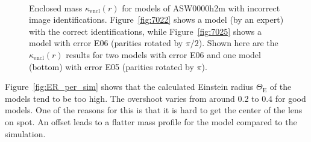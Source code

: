 \documentclass[12pt,preprint]{aastex}
\newcommand{\ERf}[1][]{Einstein radius $\Theta_\text{E#1}$\xspace} %
\newcommand{\kenc}[1][r]{$\kappa_\text{encl}(#1)$\xspace}
\newcommand{\figref}[1]{Figure~\ref{fig:#1}}
\newcommand{\Figref}[1]{Figure~\ref{fig:#1}}
\newcommand{\asw}[1]{ASW000#1\xspace}
\begin{document}
\begin{figure}
  \centering
   \\
  \caption{Enclosed mass \kenc for models of \asw{0h2m} with incorrect image identifications. \figref{7022} shows a model (by an expert) with the correct identifications, while \figref{7025} shows a model with error E06 (parities rotated by $\pi/2$).  Shown here are the \kenc results for two models with error E06 and one model (bottom) with error E05 (parities rotated by $\pi$).}
\label{fig:kapenc_compare_faulty}
\end{figure}

\Figref{ER_per_sim} shows that the calculated \ERf of the models tend to be too high.
The overshoot varies from around 0.2 to 0.4 for good models.
One of the reasons for this is that it is hard to get the center of the lens on spot.
An offset leads to a flatter mass profile for the model compared to the simulation.
\end{document}
